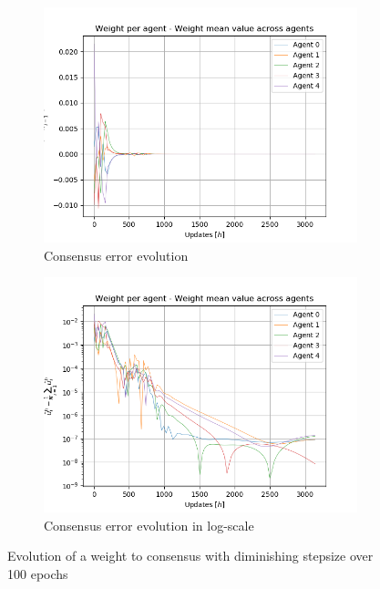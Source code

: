 \documentclass[a4paper,11pt,oneside]{book}
\begin{document}
\begin{figure}[h]
\centering
	\begin{subfigure}{0.49\textwidth}	
	\includegraphics[width=\textwidth]{diminishing/weight_100}
	\caption{Consensus error evolution}
	\end{subfigure}
\hfill
	\begin{subfigure}{0.49\textwidth}	
	\includegraphics[width=\textwidth]{diminishing/weight_100_log}
	\caption{Consensus error evolution in log-scale}
	\end{subfigure}
\caption{Evolution of a weight to consensus with diminishing stepsize over 100 epochs}
\label{diminish_weights}
\end{figure}
\bigskip
\end{document}
